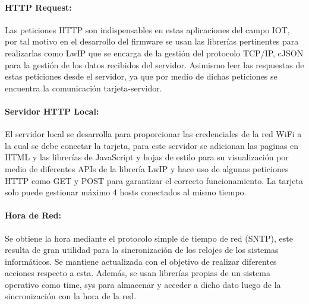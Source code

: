 
\paragraph{HTTP Request:}

Las peticiones HTTP son indispensables en estas aplicaciones del campo IOT, por tal motivo en el desarrollo del firmware se usan las librerías pertinentes para realizarlas como LwIP que se encarga de la gestión del protocolo TCP/IP, cJSON para la gestión de los datos recibidos del servidor. Asimismo leer las respuestas de estas peticiones desde el servidor, ya que por medio de dichas peticiones se encuentra la comunicación tarjeta-servidor.

\paragraph{Servidor HTTP Local:}

El servidor local se desarrolla para proporcionar las credenciales de la red WiFi a la cual se debe conectar la tarjeta, para este servidor se adicionan las paginas en HTML y las librerías de JavaScript y hojas de estilo para su visualización por medio de diferentes APIs de la librería LwIP y hace uso de algunas peticiones HTTP como GET y POST para garantizar el correcto funcionamiento. La tarjeta solo puede gestionar máximo 4 hosts conectados al mismo tiempo.

\paragraph{Hora de Red:}

Se obtiene la hora mediante el protocolo simple de tiempo de red (SNTP), este resulta de gran utilidad para la sincronización de los relojes de los sistemas informáticos. Se mantiene actualizada con el objetivo de realizar diferentes acciones respecto a esta. Además, se usan librerías propias de un sistema operativo como time, sys para almacenar y acceder a dicho dato luego de la sincronización con la hora de la red.

